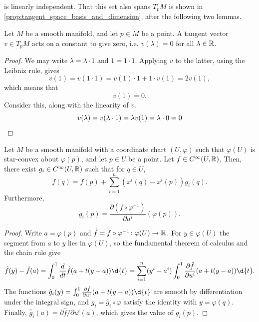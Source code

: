 \documentclass[a4paper,12pt]{article}
\begin{document}
is linearly independent.
That this set also spans $T_p M$ is shown in \cref{prop:tangent_space_basis_and_dimension}, after the following two lemmas.
\begin{lemma}\label{lem:tangent_vector_on_constant}
    Let $M$ be a smooth manifold, and let $p \in M$ be a point.
    A tangent vector $v \in T_p M$ acts on a constant to give zero, i.e. $v(\lambda) = 0$ for all $\lambda \in \mathbb{R}$.
\end{lemma}
\begin{proof}
    We may write $\lambda = \lambda \cdot 1$ and $1 = 1 \cdot 1$.
    Applying $v$ to the latter, using the Leibniz rule, gives
    \begin{equation*}
        v(1) = v(1 \cdot 1) = v(1) \cdot 1 + 1 \cdot v(1) = 2v(1),
    \end{equation*}
    which means that
    \begin{equation*}
        v(1) = 0.
    \end{equation*}
    Consider this, along with the linearity of $v$.
    \begin{equation*}
        v(\lambda) = v(\lambda \cdot 1) = \lambda v(1) = \lambda \cdot 0 = 0 \qedhere
    \end{equation*}
\end{proof}
\begin{lemma}\label{lem:hadamard's_lemma}
    Let $M$ be a smooth manifold with a coordinate chart $(U, \varphi)$ such that $\varphi(U)$ is star-convex about $\varphi(p)$, and let $p \in U$ be a point.
    Let $f \in C^\infty(U, \mathbb{R})$.
    Then, there exist $g_i \in C^\infty(U, \mathbb{R})$ such that for $q \in U$,
    \begin{equation}
        f(q) = f(p) + \sum_{i=1}^n (x^i(q) - x^i(p)) g_i(q).
    \end{equation}
    Furthermore,
    \begin{equation}
        g_i(p) = \frac{\partial (f \circ \varphi^{-1})}{\partial u^i}(\varphi(p)).
    \end{equation}
\end{lemma}
\begin{proof}
    Write $a = \varphi(p)$ and $\hat{f} = f \circ \varphi^{-1} \colon \varphi(U) \to \mathbb{R}$.
    For $y \in \varphi(U)$ the segment from $a$ to $y$ lies in $\varphi(U)$, so the fundamental theorem of calculus and the chain rule give
    \begin{equation*}
        \hat{f}(y) - \hat{f}(a) = \int_0^1 \frac{d}{dt} \hat{f}(a + t(y - a)) \d{t} = \sum_{i=1}^n (y^i - a^i) \int_0^1 \frac{\partial \hat{f}}{\partial u^i}(a + t(y - a)) \d{t}.
    \end{equation*}
    The functions $\hat{g}_i(y) = \int_0^1 \frac{\partial \hat{f}}{\partial u^i}(a + t(y - a)) \d{t}$ are smooth by differentiation under the integral sign, and $g_i = \hat{g}_i \circ \varphi$ satisfy the identity with $y = \varphi(q)$.
    Finally, $\hat{g}_i(a) = \partial \hat{f}/\partial u^i (a)$, which gives the value of $g_i(p)$.
\end{proof}
\end{document}
